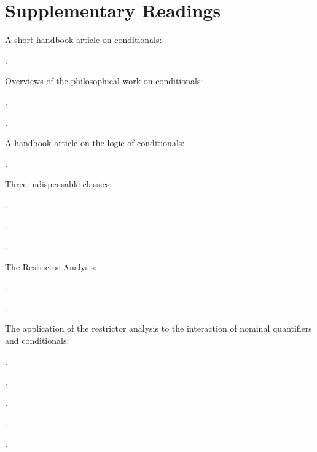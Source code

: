 \newpage\section*{Supplementary Readings} \label{sec:suppl-read-conditionals}

 {}

{\setlength{\parindent}{0pt}\setlength{\parskip}{6pt}

A short handbook article on conditionals:
\begin{bibentrylist}
	\item{}.
\end{bibentrylist}

Overviews of the philosophical work on conditionals:
\begin{bibentrylist}
	\item {}.
	\item {}.
\end{bibentrylist}

A handbook article on the logic of conditionals:
\begin{bibentrylist}
	\item {}.
\end{bibentrylist}

Three indispensable classics:
\begin{bibentrylist}
	\item {}.
	\item {}.
	\item {}. 
\end{bibentrylist}

The Restrictor Analysis:
\begin{bibentrylist}
	\item {}. 
	\item {}.
\end{bibentrylist}

The application of the restrictor analysis to the interaction of nominal quantifiers and conditionals:
\begin{bibentrylist}
	\item {}.
	\item {}.
	\item {}.
	\item {}.
	\item {}.
\end{bibentrylist}

}
